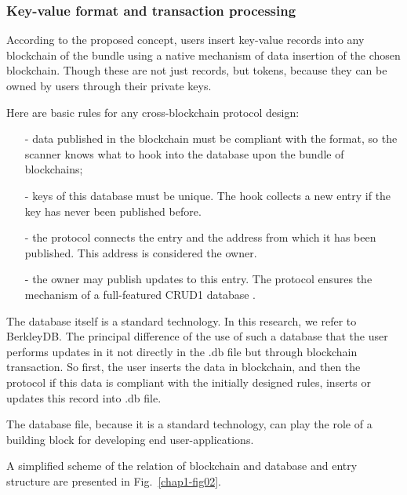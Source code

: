 \begin{multicols}{2}
\subsubsection{Key-value format and transaction processing}\label{subsubsec-4.1.2}

According to the proposed concept, users insert key-value records into any blockchain of the bundle using a native mechanism of data insertion of the chosen blockchain. Though these are not just records, but tokens, because they can be owned by users through their private keys.

Here are basic rules for any cross-blockchain protocol design:
\begin{itemize}
\item [-]data published in the blockchain must be compliant with the format, so the scanner knows what to hook into the database upon the bundle of blockchains;
\item [-] keys of this database must be unique. The hook collects a new entry if the key has never been published before.
\item [-] the protocol connects the entry and the address from which it has been published. This address is considered the owner.
\item [-] the owner may publish updates to this entry. The protocol ensures the mechanism of a full-featured CRUD1 database \cite{art1-key27}.
\end{itemize}

The database itself is a standard technology. In this research, we refer to BerkleyDB. The principal difference of the use of such a database that the user performs updates in it not directly in the .db file but through blockchain transaction. So first, the user inserts the data in blockchain, and then the protocol if this data is compliant with the initially designed rules, inserts or updates this record into .db file.

The database file, because it is a standard technology, can play the role of a building block for developing end user-applications.

A simplified scheme of the relation of blockchain and database and entry structure are presented in Fig.~\ref{chap1-fig02}.



\end{multicols}
